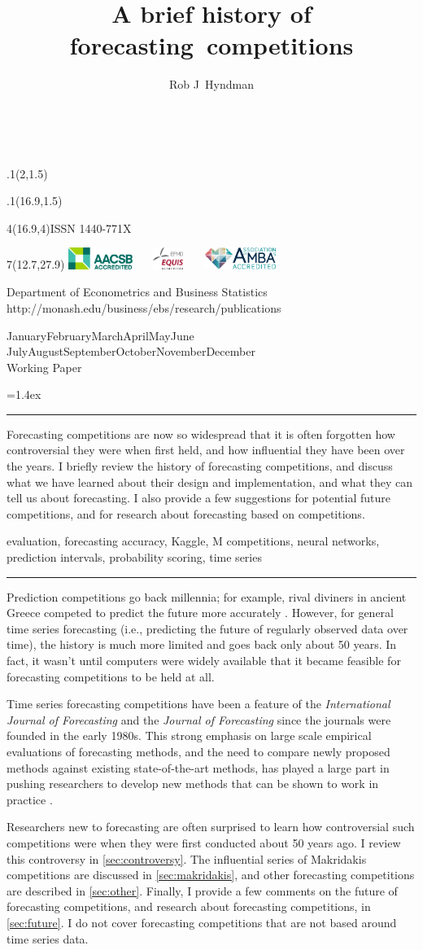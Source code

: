 \documentclass[11pt,a4paper,]{article}
\title{A brief history of forecasting~competitions}
\author{Rob J~Hyndman}
\date{\sf\Date~\Month~\Year}
\makeatletter
\def\Date{\number\day}
\def\Month{\ifcase\month\or
 January\or February\or March\or April\or May\or June\or
 July\or August\or September\or October\or November\or December\fi}
\def\Year{\number\year}
\def\cover{{\sffamily\setcounter{page}{0}
        \thispagestyle{empty}
        \placefig{2}{1.5}{width=5cm}{monash2}
        \placefig{16.9}{1.5}{width=2.1cm}{MBusSchool}
        \begin{textblock}{4}(16.9,4)ISSN 1440-771X\end{textblock}
        \begin{textblock}{7}(12.7,27.9)\hfill
        \includegraphics[height=0.7cm]{AACSB}~~~
        \includegraphics[height=0.7cm]{EQUIS}~~~
        \includegraphics[height=0.7cm]{AMBA}
        \end{textblock}
        \vspace*{2cm}
        \begin{center}\Large
        Department of Econometrics and Business Statistics\\[.5cm]
        \footnotesize http://monash.edu/business/ebs/research/publications
        \end{center}\vspace{2cm}
        \begin{center}
        \fbox{\parbox{14cm}{\begin{onehalfspace}\centering\Huge\vspace*{0.3cm}
                \textsf{\textbf{\expandafter{\@title}}}\vspace{1cm}\par
                \LARGE\@author\end{onehalfspace}
        }}
        \end{center}
        \vfill
                \begin{center}\Large
                \Month~\Year\\[1cm]
                Working Paper \@wp
        \end{center}\vspace*{2cm}}}
\def\pageone{{\sffamily\setstretch{1}%
        \thispagestyle{empty}%
        \vbox to \textheight{%
        \raggedright\baselineskip=1.2cm
     {\fontsize{24.88}{30}\sffamily\textbf{\expandafter{\@title}}}
        \vspace{2cm}\par
        \hspace{1cm}\parbox{14cm}{\sffamily\large\@addresses}\vspace{1cm}\vfill
        \hspace{1cm}{\large\Date~\Month~\Year}\vss}}}
\def\blindtitle{{\sffamily
     \thispagestyle{plain}\raggedright\baselineskip=1.2cm
     {\fontsize{24.88}{30}\sffamily\textbf{\expandafter{\@title}}}\vspace{1cm}\par
        }}
\def\titlepage{{\cover\newpage\pageone\newpage\blindtitle}}
\let\maketitle\titlepage
\newenvironment{keywords}{\par\vspace{0.5cm}\noindent{\sffamily\textbf{Keywords:}}}{\vspace{0.25cm}\par\hrule\vspace{0.5cm}\par}
\renewenvironment{abstract}{\begin{minipage}{\textwidth}\parskip=1.4ex\noindent
\hrule\vspace{0.1cm}\par{\sffamily\textbf{\abstractname}}\newline}
  {\end{minipage}}
\def\placefig#1#2#3#4{\begin{textblock}{.1}(#1,#2)\rlap{\texttt{[image: \#4]}}\end{textblock}}
\makeatother
\begin{document}
\maketitle
\begin{abstract}
Forecasting competitions are now so widespread that it is often forgotten how controversial they were when first held, and how influential they have been over the years. I briefly review the history of forecasting competitions, and discuss what we have learned about their design and implementation, and what they can tell us about forecasting. I also provide a few suggestions for potential future competitions, and for research about forecasting based on competitions.
\end{abstract}
\begin{keywords}
evaluation, forecasting accuracy, Kaggle, M competitions, neural networks, prediction intervals, probability scoring, time series
\end{keywords}

Prediction competitions go back millennia; for example, rival diviners in ancient Greece competed to predict the future more accurately \autocite[p124]{Raphals2013}. However, for general time series forecasting (i.e., predicting the future of regularly observed data over time), the history is much more limited and goes back only about 50 years. In fact, it wasn't until computers were widely available that it became feasible for forecasting competitions to be held at all.

Time series forecasting competitions have been a feature of the \emph{International Journal of Forecasting} and the \emph{Journal of Forecasting} since the journals were founded in the early 1980s. This strong emphasis on large scale empirical evaluations of forecasting methods, and the need to compare newly proposed methods against existing state-of-the-art methods, has played a large part in pushing researchers to develop new methods that can be shown to work in practice \autocite{FildesOrd2002}.

Researchers new to forecasting are often surprised to learn how controversial such competitions were when they were first conducted about 50 years ago. I review this controversy in \autoref{sec:controversy}. The influential series of Makridakis competitions are discussed in \autoref{sec:makridakis}, and other forecasting competitions are described in \autoref{sec:other}. Finally, I provide a few comments on the future of forecasting competitions, and research about forecasting competitions, in \autoref{sec:future}. I do not cover forecasting competitions that are not based around time series data.
\end{document}
